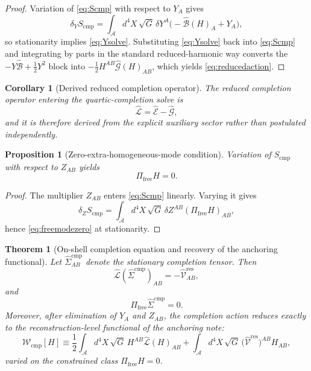 \documentclass[11pt]{article}
\newcommand{\Sub}{\mathcal A}
\newcommand{\CompLift}{\widehat\Sigma^{\mathrm{cmp}}}
\newcommand{\ResidualLift}{\widehat{\mathcal V}^{\mathrm{res}}}
\newcommand{\CompFunctional}{\mathcal W_{\mathrm{cmp}}}
\newcommand{\CompAction}{S_{\mathrm{cmp}}}
\newcommand{\SubEinLin}{\widehat{\mathcal E}}
\newcommand{\SubGaugeVec}{\widehat{\mathcal B}}
\newcommand{\SubGaugeBook}{\widehat{\mathcal G}}
\newcommand{\SubReducedEin}{\widehat{\mathcal L}}
\newcommand{\FreeProj}{\Pi_{\mathrm{free}}}
\newcommand{\GaugeAux}{Y}
\newcommand{\ModeAux}{Z}
\newtheorem{proposition}{Proposition}
\newtheorem{corollary}{Corollary}
\newtheorem{theorem}{Theorem}
\begin{document}
\begin{proof}
Variation of \eqref{eq:Scmp} with respect to \(\GaugeAux_A\) gives
\[
\delta_{\GaugeAux}\CompAction
=
\int_{\Sub} d^4X\,\sqrt{G}\,
\delta \GaugeAux^A\bigl(-\SubGaugeVec(H)_A+\GaugeAux_A\bigr),
\]
so stationarity implies \eqref{eq:Ysolve}. Substituting \eqref{eq:Ysolve} back into \eqref{eq:Scmp} and integrating by parts in the standard reduced-harmonic way converts the \(-\GaugeAux\SubGaugeVec+\frac12 \GaugeAux^2\) block into \(-\frac12 H^{AB}\SubGaugeBook(H)_{AB}\), which yields \eqref{eq:reducedaction}.
\end{proof}

\begin{corollary}[Derived reduced completion operator]
\label{cor:derivedL}
The reduced completion operator entering the quartic-completion solve is
\[
\SubReducedEin=\SubEinLin-\SubGaugeBook,
\]
and it is therefore derived from the explicit auxiliary sector rather than postulated independently.
\end{corollary}

\begin{proposition}[Zero-extra-homogeneous-mode condition]
\label{prop:Z}
Variation of \(\CompAction\) with respect to \(\ModeAux_{AB}\) yields
\begin{equation}
\FreeProj H=0.
\label{eq:freemodezero}
\end{equation}
\end{proposition}

\begin{proof}
The multiplier \(\ModeAux_{AB}\) enters \eqref{eq:Scmp} linearly. Varying it gives
\[
\delta_{\ModeAux}\CompAction
=
\int_{\Sub} d^4X\,\sqrt{G}\,
\delta \ModeAux^{AB}(\FreeProj H)_{AB},
\]
hence \eqref{eq:freemodezero} at stationarity.
\end{proof}

\begin{theorem}[On-shell completion equation and recovery of the anchoring functional]
\label{thm:onshell}
Let \(\CompLift_{AB}\) denote the stationary completion tensor. Then
\begin{equation}
\SubReducedEin(\CompLift)_{AB}
=
-\ResidualLift_{AB},
\label{eq:subsolve}
\end{equation}
and
\begin{equation}
\FreeProj\CompLift=0.
\label{eq:nofree}
\end{equation}
Moreover, after elimination of \(\GaugeAux_A\) and \(\ModeAux_{AB}\), the completion action reduces exactly to the reconstruction-level functional of the anchoring note:
\begin{equation}
\CompFunctional[H]
\equiv
\frac12
\int_{\Sub} d^4X\,\sqrt{G}\,H^{AB}\SubReducedEin(H)_{AB}
+
\int_{\Sub} d^4X\,\sqrt{G}\,\bigl(\ResidualLift\bigr)^{AB}H_{AB},
\label{eq:functional}
\end{equation}
varied on the constrained class \(\FreeProj H=0\).
\end{theorem}
\end{document}
